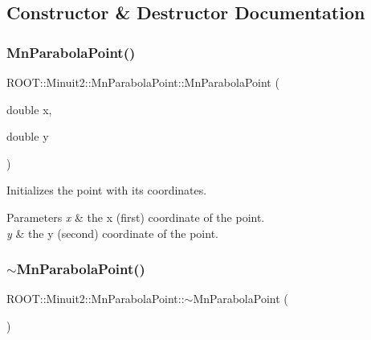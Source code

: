 \subsection{Constructor \& Destructor Documentation}
\mbox{\label{classROOT_1_1Minuit2_1_1MnParabolaPoint_a6ce250c4449c7ca37c2772462a88190b}} 
\subsubsection{\texorpdfstring{MnParabolaPoint()}{MnParabolaPoint()}\hspace{0.1cm}{\footnotesize\ttfamily [1/3]}}
{\footnotesize\ttfamily R\+O\+O\+T\+::\+Minuit2\+::\+Mn\+Parabola\+Point\+::\+Mn\+Parabola\+Point (\begin{DoxyParamCaption}\item[{double}]{x,  }\item[{double}]{y }\end{DoxyParamCaption})\hspace{0.3cm}{\ttfamily [inline]}}

Initializes the point with its coordinates.


\begin{DoxyParams}{Parameters}
{\em x} & the x (first) coordinate of the point. \\
\hline
{\em y} & the y (second) coordinate of the point. \\
\hline
\end{DoxyParams}
\mbox{\label{classROOT_1_1Minuit2_1_1MnParabolaPoint_ac2acc4c4843b4678005cb2d4610f7555}} 
\subsubsection{\texorpdfstring{$\sim$MnParabolaPoint()}{~MnParabolaPoint()}\hspace{0.1cm}{\footnotesize\ttfamily [1/3]}}
{\footnotesize\ttfamily R\+O\+O\+T\+::\+Minuit2\+::\+Mn\+Parabola\+Point\+::$\sim$\+Mn\+Parabola\+Point (\begin{DoxyParamCaption}{ }\end{DoxyParamCaption})\hspace{0.3cm}{\ttfamily [inline]}}

